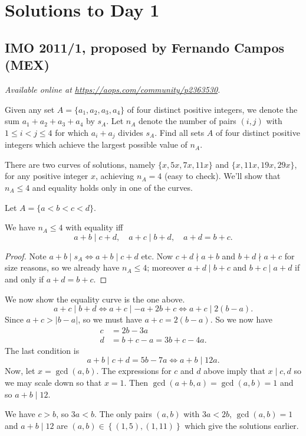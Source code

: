 \documentclass[11pt]{scrartcl}
\begin{document}
\section{Solutions to Day 1}
\subsection{IMO 2011/1, proposed by Fernando Campos (MEX)}
\textsl{Available online at \url{https://aops.com/community/p2363530}.}
\begin{mdframed}[style=mdpurplebox,frametitle={Problem statement}]
Given any set $A = \{a_1, a_2, a_3, a_4\}$ of four distinct
positive integers, we denote the sum $a_1+a_2+a_3+a_4$ by $s_A$.
Let $n_A$ denote the number of pairs $(i,j)$ with $1 \le i < j \le 4$
for which $a_i + a_j$ divides $s_A$.
Find all sets $A$ of four distinct positive integers which achieve
the largest possible value of $n_A$.
\end{mdframed}
There are two curves of solutions,
namely $\{x,5x,7x,11x\}$ and $\{x,11x,19x,29x\}$, for any positive integer $x$,
achieving $n_A = 4$ (easy to check).
We'll show that $n_A \le 4$ and equality holds only in one of the curves.

Let $A = \{a < b < c < d\}$.
\begin{claim*}
  We have $n_A \le 4$ with equality iff
  \[ a+b \mid c+d, \quad a+c \mid b+d, \quad a+d = b+c. \]
\end{claim*}
\begin{proof}
  Note $a+b \mid s_A \iff a+b \mid c+d$ etc.
  Now $c+d \nmid a+b$ and $b+d \nmid a+c$ for size reasons, so we already have $n_A \le 4$;
  moreover $a+d \mid b+c$ and $b+c \mid a+d$ if and only if $a+d = b+c$.
\end{proof}

We now show the equality curve is the one above.
\[ a+c  \mid b+d \iff a+c \mid -a+2b+c \iff a+c \mid 2(b-a). \]
Since $a+c > |b-a|$, so we must have $a+c=2(b-a)$.
So we now have
\begin{align*}
  c &= 2b-3a \\
  d &= b+c-a = 3b+c-4a.
\end{align*}
The last condition is
\[ a+b \mid c+d = 5b-7a \iff a+b \mid 12a. \]
Now, let $x = \gcd(a,b)$.
The expressions for $c$ and $d$ above imply that
$x \mid c,d$ so we may scale down so that $x = 1$.
Then $\gcd(a+b,a) = \gcd(a,b) = 1$ and so $a+b \mid 12$.

We have $c > b$, so $3a < b$.
The only pairs $(a,b)$ with $3a < 2b$, $\gcd(a,b) = 1$ and $a+b \mid 12$
are $(a,b) \in \left\{ (1,5), (1,11) \right\}$ which give the solutions earlier.
\pagebreak
\end{document}
